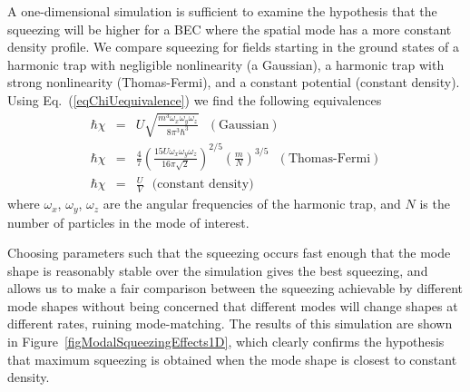 \documentclass{iopart}
\begin{document}
A one-dimensional simulation is sufficient to examine the hypothesis that the squeezing will be higher for a BEC where the spatial mode has a more constant density profile.  We compare squeezing for fields starting in the ground states of a harmonic trap with negligible nonlinearity (a Gaussian), a harmonic trap with strong nonlinearity (Thomas-Fermi), and a constant potential (constant density). Using Eq.~(\ref{eqChiUequivalence}) we find the following equivalences
\begin{eqnarray}
\hbar \chi &=& U \sqrt{\frac{m^3 \omega_x \omega_y \omega_z}{8 \pi^3 \hbar^3}} \,\,\,\, ({\textrm{Gaussian}}) \\
%
\hbar \chi &=& \frac{4}{7} \left( \frac{15 U \omega_x \omega_y \omega_z}{16 \pi \sqrt{2}} \right)^{2/5} \left( \frac{m}{N} \right)^{3/5} \,\,\,\, ({\textrm{Thomas-Fermi}}) \\
%
\hbar \chi &=& \frac{U}{V} \,\,\,\, {\textrm{(constant density)}}
\end{eqnarray}
%
where $\omega_x$, $\omega_y$, $\omega_z$ are the angular frequencies of the harmonic trap, and $N$ is the number of particles in the mode of interest.

Choosing parameters such that the squeezing occurs fast enough that the mode shape is reasonably stable over the simulation gives the best squeezing, and allows us to make a fair comparison between the squeezing achievable by different mode shapes without being concerned that different modes will change shapes at different rates, ruining mode-matching. The results of this simulation are shown in Figure~\ref{figModalSqueezingEffects1D}, which clearly confirms the hypothesis that maximum squeezing is obtained when the mode shape is closest to constant density.
\end{document}
